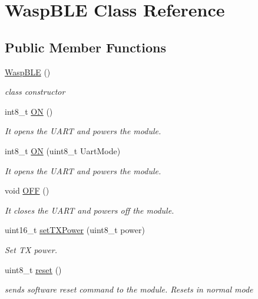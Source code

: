 \hypertarget{class_wasp_b_l_e}{}\section{Wasp\+B\+LE Class Reference}
\label{class_wasp_b_l_e}
\subsection*{Public Member Functions}
\begin{DoxyCompactItemize}
\item 
\hyperlink{class_wasp_b_l_e_a28117c31141d2441ba3ff225ee01b306}{Wasp\+B\+LE} ()
\begin{DoxyCompactList}\small\item\em class constructor \end{DoxyCompactList}\item 
int8\+\_\+t \hyperlink{class_wasp_b_l_e_a4fcb1ff68f3173175b57c26290f6d0c5}{ON} ()
\begin{DoxyCompactList}\small\item\em It opens the U\+A\+RT and powers the module. \end{DoxyCompactList}\item 
int8\+\_\+t \hyperlink{class_wasp_b_l_e_ad07154036c12d27c38dc5c54502b4d9e}{ON} (uint8\+\_\+t Uart\+Mode)
\begin{DoxyCompactList}\small\item\em It opens the U\+A\+RT and powers the module. \end{DoxyCompactList}\item 
void \hyperlink{class_wasp_b_l_e_a6cdd7162e3c7cc1404d1f99025524c0e}{O\+FF} ()
\begin{DoxyCompactList}\small\item\em It closes the U\+A\+RT and powers off the module. \end{DoxyCompactList}\item 
uint16\+\_\+t \hyperlink{class_wasp_b_l_e_a93326130d1b068d9c918829233f0f796}{set\+T\+X\+Power} (uint8\+\_\+t power)
\begin{DoxyCompactList}\small\item\em Set TX power. \end{DoxyCompactList}\item 
uint8\+\_\+t \hyperlink{class_wasp_b_l_e_a97e9719e1061680ed11acd8eccd33b1e}{reset} ()
\begin{DoxyCompactList}\small\item\em sends software reset command to the module. Resets in normal mode \end{DoxyCompactList}\item 

\end{DoxyCompactItemize}
